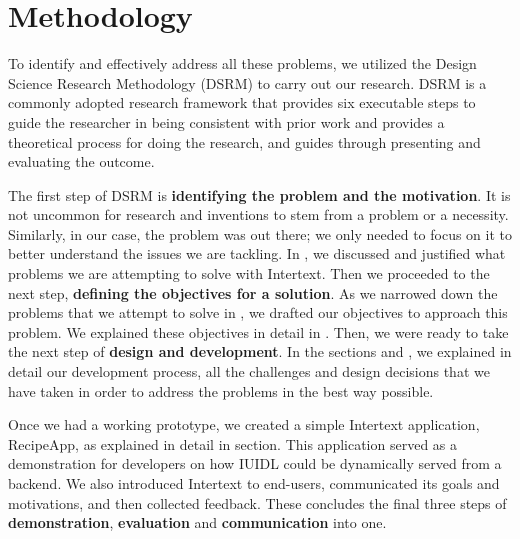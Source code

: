 
\section{Methodology} \label{methodology}

To identify and effectively address all these problems, we utilized the Design Science Research Methodology (DSRM) \cite{DSRM} to carry out our research. DSRM is a commonly adopted research framework that provides six executable steps to guide the researcher in being consistent with prior work and provides a theoretical process for doing the research, and guides through presenting and evaluating the outcome. 

The first step of DSRM is \textbf{identifying the problem and the motivation}. It is not uncommon for research and inventions to stem from a problem or a necessity. Similarly, in our case, the problem was out there; we only needed to focus on it to better understand the issues we are tackling. In , we discussed and justified what problems we are attempting to solve with Intertext. Then we proceeded to the next step, \textbf{defining the objectives for a solution}. As we narrowed down the problems that we attempt to solve in , we drafted our objectives to approach this problem. We explained these objectives in detail in . Then, we were ready to take the next step of \textbf{design and development}. In the sections  and , we explained in detail our development process, all the challenges and design decisions that we have taken in order to address the problems in the best way possible. 

Once we had a working prototype, we created a simple Intertext application, RecipeApp, as explained in detail in  section. This application served as a demonstration for developers on how IUIDL could be dynamically served from a backend. We also introduced Intertext to end-users, communicated its goals and motivations, and then collected feedback. These concludes the final three steps of \textbf{demonstration}, \textbf{evaluation} and \textbf{communication} into one.